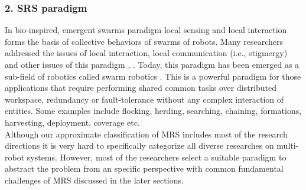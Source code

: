 \subsubsection*{2. SRS paradigm}
In bio-inspired, emergent swarms paradigm local sensing and local interaction forms the basis of collective behaviors of swarms of robots. Many researchers addressed the issues of local interaction, local communication (i.e., stigmergy) and other issues of this paradigm \cite{Mataric1995}, \cite{Kube+1993}. Today, this paradigm has been emerged as a sub-field of robotics called swarm robotics \cite{Sahin+2005}. This is a powerful paradigm for those applications that require performing shared common tasks over distributed workspace, redundancy or fault-tolerance without any complex interaction of entities. Some examples include flocking, herding, searching, chaining, formations, harvesting, deployment, coverage etc. \\
Although our approximate classification of MRS includes most of the research directions it is very hard to specifically categorize all diverse researches on multi-robot systems. However, most of the researchers select a suitable paradigm to abstract the problem from an specific perspective with common fundamental challenges of MRS discussed in the later sections.
